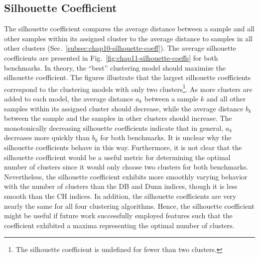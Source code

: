 \clearpage

\subsection{Silhouette Coefficient}
\label{subsec:chap11-silhouette-coeff}

The silhouette coefficient compares the average distance between a sample and all other samples within its assigned cluster to the average distance to samples in all other clusters (Sec.~\ref{subsec:chap10-silhouette-coeff}). The average silhouette coefficients are presented in Fig.~\ref{fig:chap11-silhouette-coeffs} for both benchmarks. In theory, the ``best'' clustering model should maximize the silhouette coefficient. The figures illustrate that the largest silhouette coefficients correspond to the clustering models with only two clusters\footnote{The silhouette coefficient is undefined for fewer than two clusters.}. As more clusters are added to each model, the average distance $a_{k}$ between a sample $k$ and all other samples within its assigned cluster should decrease, while the average distance $b_{k}$ between the sample and the samples in other clusters should increase. The monotonically decreasing silhouette coefficients indicate that in general, $a_{k}$ decreases more quickly than $b_{k}$ for both benchmarks. It is unclear why the silhouette coefficients behave in this way. Furthermore, it is not clear that the silhouette coefficient would be a useful metric for determining the optimal number of clusters since it would only choose two clusters for both benchmarks. Nevertheless, the silhouette coefficient exhibits more smoothly varying behavior with the number of clusters than the DB and Dunn indices, though it is less smooth than the CH indices. In addition, the silhouette coefficients are very nearly the same for all four clustering algorithms. Hence, the silhouette coefficient might be useful if future work successfully employed features such that the coefficient exhibited a maxima representing the optimal number of clusters.

